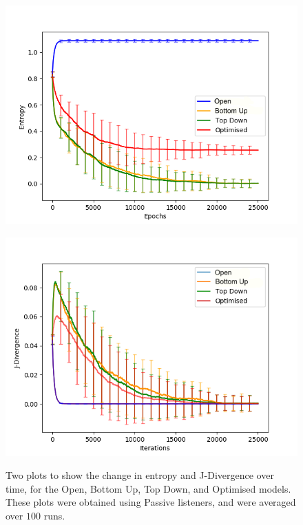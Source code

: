 \begin{figure}[H]
 \centering
  \begin{minipage}[ht]{0.49\textwidth}
    \includegraphics[width=\textwidth]{Images/Figures/All/Entropy_25000.png}
    \label{fig:entropy_all}
 \end{minipage}
 \hfill
 \begin{minipage}[ht]{0.49\textwidth}
    \includegraphics[width=\textwidth]{Images/Figures/All/J-Div_25000.png}
    \label{fig:J-div_all}
 \end{minipage}
 \caption{Two plots to show the change in entropy and J-Divergence over time, for the Open, Bottom Up, Top Down, and Optimised models. These plots were obtained using Passive listeners, and were averaged over $100$ runs.}
\end{figure}

